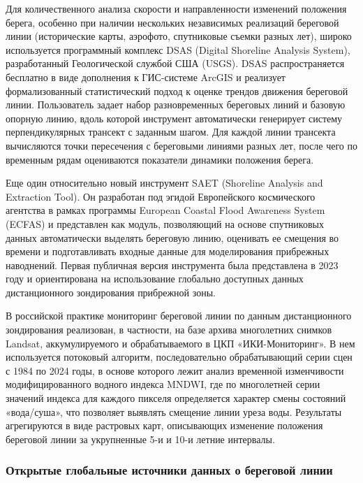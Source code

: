 Для количественного анализа скорости и направленности изменений положения берега, особенно при наличии нескольких независимых реализаций береговой линии (исторические карты, аэрофото, спутниковые съемки разных лет), широко используется программный комплекс DSAS (Digital Shoreline Analysis System), разработанный Геологической службой США (USGS). 
DSAS распространяется бесплатно в виде дополнения к ГИС-системе ArcGIS и реализует формализованный статистический подход к оценке трендов движения береговой линии. 
Пользователь задает набор разновременных береговых линий и базовую опорную линию, вдоль которой инструмент автоматически генерирует систему перпендикулярных трансект с заданным шагом. 
Для каждой линии трансекта вычисляются точки пересечения с береговыми линиями разных лет, после чего по временным рядам оцениваются показатели динамики положения берега. 

Еще один относительно новый инструмент SAET (Shoreline Analysis and Extraction Tool). 
Он разработан под эгидой Европейского космического агентства в рамках программы European Coastal Flood Awareness System (ECFAS) и представлен как модуль, позволяющий на основе спутниковых данных автоматически выделять береговую линию, оценивать ее смещения во времени и подготавливать входные данные для моделирования прибрежных наводнений. 
Первая публичная версия инструмента была представлена в 2023 году и ориентирована на использование глобально доступных данных дистанционного зондирования прибрежной зоны.

В российской практике мониторинг береговой линии по данным дистанционного зондирования реализован, в частности, на базе архива многолетних снимков Landsat, аккумулируемого и обрабатываемого в ЦКП «ИКИ-Мониторинг». 
В нем используется потоковый алгоритм, последовательно обрабатывающий серии сцен с 1984 по 2024 годы, в основе которого лежит анализ временной изменчивости модифицированного водного индекса MNDWI, где по многолетней серии значений индекса для каждого пикселя определяется характер смены состояний «вода/суша», что позволяет выявлять смещение линии уреза воды. 
Результаты агрегируются в виде растровых карт, описывающих изменение положения береговой линии за укрупненные 5-и и 10-и летние интервалы.

\subsubsection{Открытые глобальные источники данных о береговой линии}
\label{sec:open_coastline_data}

